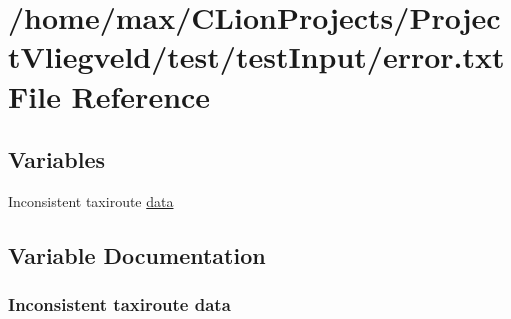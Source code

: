 \hypertarget{error_8txt}{}\section{/home/max/\+C\+Lion\+Projects/\+Project\+Vliegveld/test/test\+Input/error.txt File Reference}
\label{error_8txt}
\subsection*{Variables}
\begin{DoxyCompactItemize}
\item 
Inconsistent taxiroute \hyperlink{error_8txt_a2db91b8ae553a8888179c8dd6e74453f}{data}
\end{DoxyCompactItemize}


\subsection{Variable Documentation}
\subsubsection[{\texorpdfstring{data}{data}}]{\setlength{\rightskip}{0pt plus 5cm}Inconsistent taxiroute data}\hypertarget{error_8txt_a2db91b8ae553a8888179c8dd6e74453f}{}\label{error_8txt_a2db91b8ae553a8888179c8dd6e74453f}
